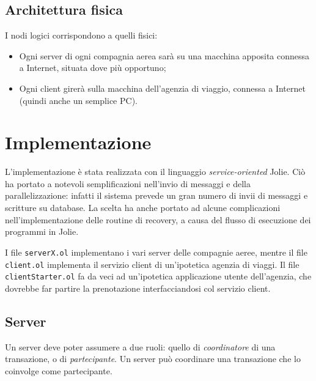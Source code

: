 \documentclass[a4paper]{article}
\begin{document}

\subsection{Architettura fisica}
I nodi logici corrispondono a quelli fisici:
\begin{itemize}
	\item Ogni server di ogni compagnia aerea sarà su una macchina apposita connessa a Internet, situata dove più opportuno;
	\item Ogni client girerà sulla macchina dell'agenzia di viaggio, connessa a Internet (quindi anche un semplice PC).
\end{itemize}


\section{Implementazione}

L'implementazione è stata realizzata con il linguaggio \textit{service-oriented} Jolie. Ciò ha portato a notevoli semplificazioni nell'invio di messaggi e della parallelizzazione: infatti il sistema prevede un gran numero di invii di messaggi e scritture su database. La scelta ha anche portato ad alcune complicazioni nell'implementazione delle routine di recovery, a causa del flusso di esecuzione dei programmi in Jolie.

I file \texttt{serverX.ol} implementano i vari server delle compagnie aeree, mentre il file \texttt{client.ol} implementa il servizio client di un'ipotetica agenzia di viaggi. Il file \texttt{clientStarter.ol} fa da veci ad un'ipotetica applicazione utente dell'agenzia, che dovrebbe far partire la prenotazione interfacciandosi col servizio client.

\subsection{Server}
Un server deve poter assumere a due ruoli: quello di \textit{coordinatore} di una transazione, o di \textit{partecipante}. Un server può coordinare una transazione che lo coinvolge come partecipante.
\end{document}
